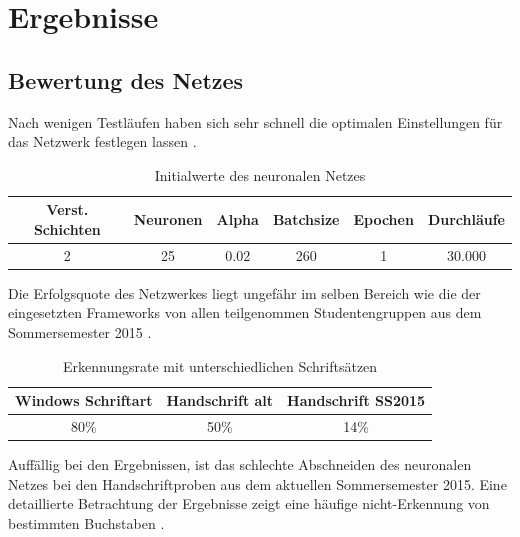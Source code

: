 \chapter{Ergebnisse}
\section{Bewertung des Netzes}
Nach wenigen Testläufen haben sich sehr schnell die optimalen Einstellungen für das Netzwerk festlegen lassen .

\begin{table}[h!]
	\centering	
	\begin{tabular}{c|c|c|c|c|c}
	  \textbf{Verst. Schichten} & \textbf{Neuronen} & \textbf{Alpha} & \textbf{Batchsize} & \textbf{Epochen} & \textbf{Durchläufe} \\ \hline 
	  2 & 25 & 0.02 & 260 & 1 & 30.000 \\ 
	\end{tabular}
	\caption{Initialwerte des neuronalen Netzes}
	\label{settings}
\end{table}

Die Erfolgsquote des Netzwerkes liegt ungefähr im selben Bereich wie die der eingesetzten Frameworks von allen teilgenommen Studentengruppen aus dem Sommersemester 2015 . 

\begin{table}[h!]
	\centering	
	\begin{tabular}{c|c|c}
	  \textbf{Windows Schriftart} & \textbf{Handschrift alt} & \textbf{Handschrift SS2015} \\ \hline 
	  80\% & 50\% & 14\%  \\ 
	\end{tabular}
	\caption{Erkennungsrate mit unterschiedlichen Schriftsätzen}
	\label{result}
\end{table}

Auffällig bei den Ergebnissen, ist das schlechte Abschneiden des neuronalen Netzes bei den Handschriftproben aus dem aktuellen Sommersemester 2015. Eine detaillierte Betrachtung der Ergebnisse zeigt eine häufige nicht-Erkennung von bestimmten Buchstaben . 

